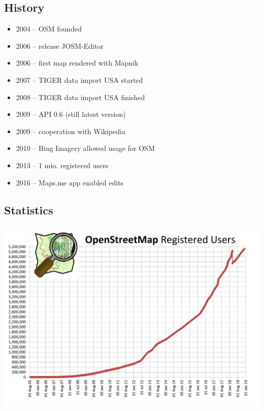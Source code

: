 \documentclass{beamer}
\begin{document}
	\subsection{History}

	\begin{frame}
		\begin{itemize}
			\item 2004 -- OSM founded
			\item 2006 -- release JOSM-Editor
			\item 2006 -- first map rendered with Mapnik
			\item 2007 -- TIGER data import USA started
			\item 2008 -- TIGER data import USA finished
			\item 2009 -- API 0.6 (still latest version)
			\item 2009 -- cooperation with Wikipedia
			\item 2010 -- Bing Imagery allowed usage for OSM
			\item 2013 -- 1 mio. registered users
			\item 2016 -- Maps.me app enabled edits
		\end{itemize}
	\end{frame}

	\subsection{Statistics}

	\begin{frame}
		\begin{center}
			\includegraphics[width=\textwidth,height=\textheight,keepaspectratio]{images/Osmdbstats1_users.png}
		\end{center}
	\end{frame}
\end{document}
